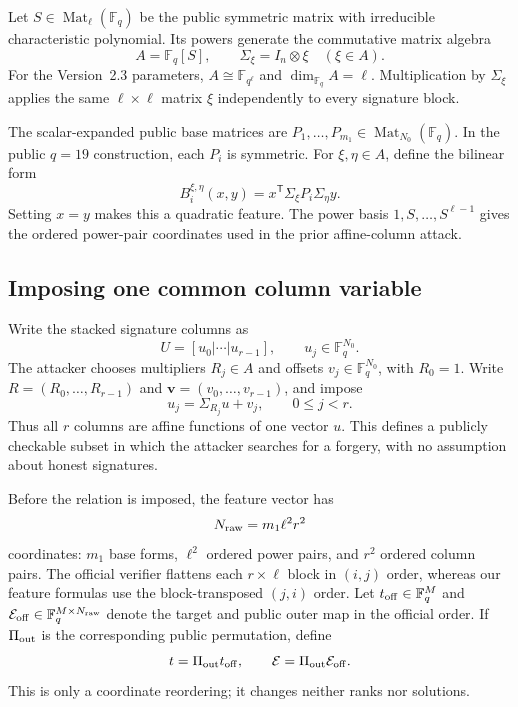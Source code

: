 \documentclass[11pt]{article}
\newcommand{\F}{\mathbb F}
\newcommand{\Mat}{\operatorname{Mat}}
\newcommand{\transpose}{\mathsf T}
\begin{document}
Let $S\in\Mat_\ell(\F_q)$ be the public symmetric matrix with irreducible
characteristic polynomial.  Its powers generate the commutative matrix
algebra
\[
 A=\F_q[S],\qquad \Sigma_\xi=I_n\otimes\xi\quad(\xi\in A).
\]
For the Version~2.3 parameters, $A\cong\F_{q^\ell}$ and
$\dim_{\F_q}A=\ell$.  Multiplication by $\Sigma_\xi$ applies the same
$\ell\times\ell$ matrix $\xi$ independently to every signature block.

The scalar-expanded public base matrices are
$P_1,\ldots,P_{m_1}\in\Mat_{N_0}(\F_q)$.  In the public $q=19$ construction,
each $P_i$ is symmetric.  For $\xi,\eta\in A$, define the bilinear form
\begin{equation}\label{eq:bilinear-form}
 B_i^{\xi,\eta}(x,y)=x^\transpose\Sigma_\xi P_i\Sigma_\eta y.
\end{equation}
Setting $x=y$ makes this a quadratic feature.  The power basis
$1,S,\ldots,S^{\ell-1}$ gives the ordered power-pair coordinates used in the
prior affine-column attack.

\subsection{Imposing one common column variable}\label{sec:affine-columns}

Write the stacked signature columns as
\[
  U=[u_0|\cdots|u_{r-1}],\qquad u_j\in\F_q^{N_0}.
\]
The attacker chooses multipliers $R_j\in A$ and offsets
$v_j\in\F_q^{N_0}$, with $R_0=1$.  Write
$R=(R_0,\ldots,R_{r-1})$ and
$\mathbf v=(v_0,\ldots,v_{r-1})$, and impose
\begin{equation}\label{eq:relation}
 u_j=\Sigma_{R_j}u+v_j,
 \qquad 0\le j<r.
\end{equation}
Thus all $r$ columns are affine functions of one vector $u$.  This defines a
publicly checkable subset in which the attacker searches for a forgery, with no
assumption about honest signatures.

Before the relation is imposed, the feature vector has
\[
  N_{\rm raw}=m_1\ell^2r^2
\]
coordinates: $m_1$ base forms, $\ell^2$ ordered power pairs, and $r^2$ ordered
column pairs.  The official verifier flattens each $r\times\ell$ block in
$(i,j)$ order, whereas our feature formulas use the block-transposed $(j,i)$
order.  Let $t_{\rm off}\in\F_q^M$ and
$\mathcal E_{\rm off}\in\F_q^{M\times N_{\rm raw}}$ denote the target and public outer
map in the official order.  If $\Pi_{\rm out}$ is the corresponding public
permutation, define
\[
  t=\Pi_{\rm out}t_{\rm off},\qquad
  \mathcal E=\Pi_{\rm out}\mathcal E_{\rm off}.
\]
This is only a coordinate reordering; it changes neither ranks nor solutions.
\end{document}
